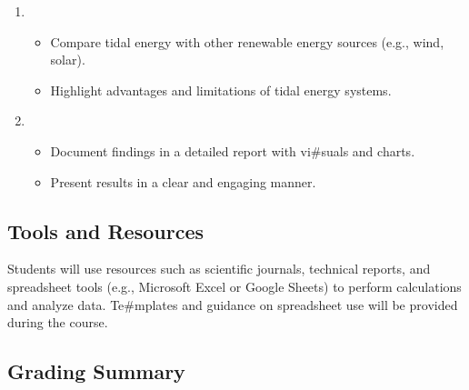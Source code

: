 \documentclass[letterpaper,10pt,english]{jupyterBook}
\begin{document}
\begin{enumerate}
\begin{itemize}
\item {} 
\sphinxAtStartPar
Evaluate possible ecological disruptions and mitigation
strategies.

\item {} 
\sphinxAtStartPar
Perform a cost\sphinxhyphen{}benefit analysis, focusing on capital and
maintenance costs.

\end{itemize}

\item {} 
\sphinxAtStartPar
{}
\begin{itemize}
\item {} 
\sphinxAtStartPar
Compare tidal energy with other renewable energy sources (e.g.,
wind, solar).

\item {} 
\sphinxAtStartPar
Highlight advantages and limitations of tidal energy systems.

\end{itemize}

\item {} 
\sphinxAtStartPar
{}
\begin{itemize}
\item {} 
\sphinxAtStartPar
Document findings in a detailed report with vi\#suals and charts.

\item {} 
\sphinxAtStartPar
Present results in a clear and engaging manner.

\end{itemize}

\end{enumerate}


\subsection{Tools and Resources}
\label{\detokenize{ProjectInstructions:id33}}
\sphinxAtStartPar
Students will use resources such as scientific journals, technical
reports, and spreadsheet tools (e.g., Microsoft Excel or Google Sheets)
to perform calculations and analyze data. Te\#mplates and guidance on
spreadsheet use will be provided during the course.


\subsection{Grading Summary}
\label{\detokenize{ProjectInstructions:id34}}
\end{document}
